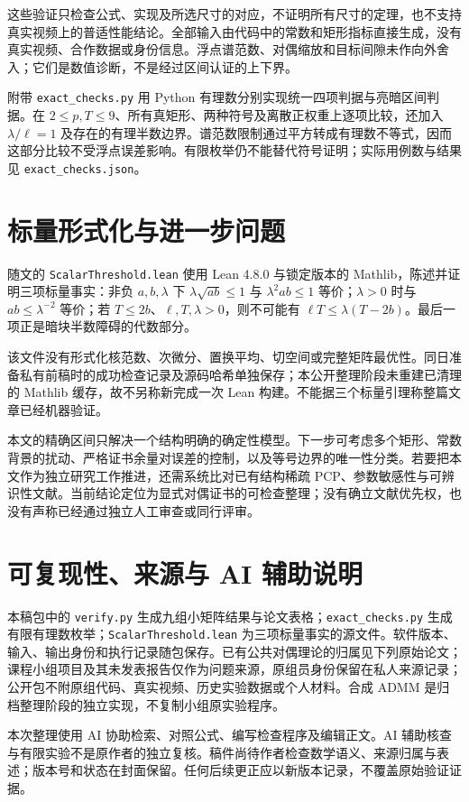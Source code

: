 \documentclass[UTF8,fontset=none,zihao=-4,a4paper]{ctexart}
\theoremstyle{plainzh}
\numberwithin{equation}{section}
\begin{document}
这些验证只检查公式、实现及所选尺寸的对应，不证明所有尺寸的定理，也不支持真实视频上的普适性能结论。全部输入由代码中的常数和矩形指标直接生成，没有真实视频、合作数据或身份信息。浮点谱范数、对偶缩放和目标间隙未作向外舍入；它们是数值诊断，不是经过区间认证的上下界。

附带 \texttt{exact\_checks.py} 用 Python 有理数分别实现统一四项判据与亮暗区间判据。在 $2\le p,T\le9$、所有真矩形、两种符号及离散正权重上逐项比较，还加入 $\lambda/\ell=1$ 及存在的有理半数边界。谱范数限制通过平方转成有理数不等式，因而这部分比较不受浮点误差影响。有限枚举仍不能替代符号证明；实际用例数与结果见 \texttt{exact\_checks.json}。

\clearpage
\section{标量形式化与进一步问题}

随文的 \texttt{ScalarThreshold.lean} 使用 Lean 4.8.0 与锁定版本的 Mathlib，陈述并证明三项标量事实：非负 $a,b,\lambda$ 下 $\lambda\sqrt{ab}\le1$ 与 $\lambda^2ab\le1$ 等价；$\lambda>0$ 时与 $ab\le\lambda^{-2}$ 等价；若 $T\le2b$、$\ell,T,\lambda>0$，则不可能有 $\ell T\le\lambda(T-2b)$。最后一项正是暗块半数障碍的代数部分。

该文件没有形式化核范数、次微分、置换平均、切空间或完整矩阵最优性。同日准备私有前稿时的成功检查记录及源码哈希单独保存；本公开整理阶段未重建已清理的 Mathlib 缓存，故不另称新完成一次 Lean 构建。不能据三个标量引理称整篇文章已经机器验证。

本文的精确区间只解决一个结构明确的确定性模型。下一步可考虑多个矩形、常数背景的扰动、严格证书余量对误差的控制，以及等号边界的唯一性分类。若要把本文作为独立研究工作推进，还需系统比对已有结构稀疏 PCP、参数敏感性与可辨识性文献。当前结论定位为显式对偶证书的可检查整理；没有确立文献优先权，也没有声称已经通过独立人工审查或同行评审。

\section*{可复现性、来源与 AI 辅助说明}
本稿包中的 \texttt{verify.py} 生成九组小矩阵结果与论文表格；\texttt{exact\_checks.py} 生成有限有理数枚举；\texttt{ScalarThreshold.lean} 为三项标量事实的源文件。软件版本、输入、输出身份和执行记录随包保存。已有公共对偶理论的归属见下列原始论文；课程小组项目及其未发表报告仅作为问题来源，原组员身份保留在私人来源记录；公开包不附原组代码、真实视频、历史实验数据或个人材料。合成 ADMM 是归档整理阶段的独立实现，不复制小组原实验程序。

本次整理使用 AI 协助检索、对照公式、编写检查程序及编辑正文。AI 辅助核查与有限实验不是原作者的独立复核。稿件尚待作者检查数学语义、来源归属与表述；版本号和状态在封面保留。任何后续更正应以新版本记录，不覆盖原始验证证据。
\end{document}
